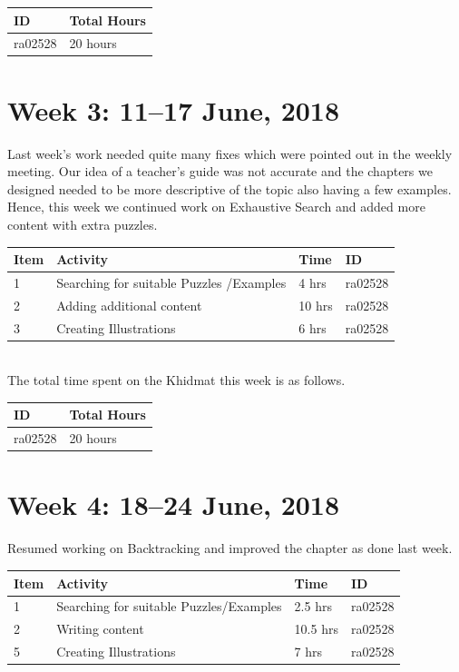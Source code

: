 \documentclass{article}
\begin{document}
\begin{tabular}{|l|l|}
  \hline
  ID & Total Hours\\\hline\hline
  ra02528 & 20 hours\\\hline
\end{tabular}

\newpage %
\section*{Week 3: 11--17 June, 2018}
Last week's work needed quite many fixes which were pointed out in the weekly meeting. Our idea of a teacher's guide was not accurate and the chapters we designed needed to be more descriptive of the topic also having a few examples. Hence, this week we continued work on Exhaustive Search and added more content with extra puzzles.
\\

\begin{tabular}{|l|l|l|l|}
  \hline
  Item 	& Activity & Time & ID \\\hline\hline
  1	& Searching for suitable Puzzles /Examples & 4 hrs & ra02528 \\\hline
  2	& Adding additional content & 10 hrs & ra02528 \\\hline
  3	& Creating Illustrations & 6 hrs & ra02528 \\\hline
\end{tabular}\\

The total time spent on the Khidmat this week is as follows.

\begin{tabular}{|l|l|}
  \hline
  ID & Total Hours\\\hline\hline
  ra02528 & 20 hours\\\hline
\end{tabular}

\newpage %
\section*{Week 4: 18--24 June, 2018}
Resumed working on Backtracking and improved the chapter as done last week.\\


\begin{tabular}{|l|l|l|l|}
  \hline
  Item 	& Activity & Time & ID \\\hline\hline
  1	& Searching for suitable Puzzles/Examples & 2.5 hrs & ra02528 \\\hline
  2	& Writing content & 10.5 hrs & ra02528 \\\hline
  5	& Creating Illustrations & 7 hrs & ra02528 \\\hline
\end{tabular}\\
\end{document}

